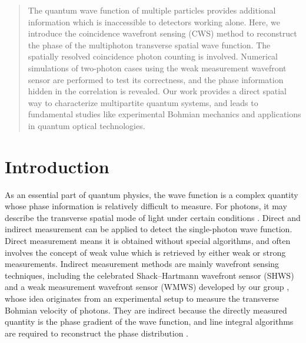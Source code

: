 \documentclass[pra,english,reprint,nofootinbib,aps,superscriptaddress,showpacs,showkeys]{revtex4-2}
\theoremstyle{definition}
\theoremstyle{remark}
\begin{document}
	\date{\today}
	
	\begin{abstract}
		The quantum wave function of multiple particles provides additional information which is inaccessible to detectors working alone. Here, we introduce the coincidence wavefront sensing (CWS) method to reconstruct the phase of the multiphoton transverse spatial wave function. The spatially resolved coincidence photon counting is involved. Numerical simulations of two-photon cases using the weak measurement wavefront sensor are performed to test its correctness, and the phase information hidden in the correlation is revealed. Our work provides a direct spatial way to characterize multipartite quantum systems, and leads to fundamental studies like experimental Bohmian mechanics and applications in quantum optical technologies.
	\end{abstract}
	
	\maketitle
	
	\section{Introduction}
	
	As an essential part of quantum physics, the wave function is a complex quantity whose phase information is relatively difficult to measure. For photons, it may describe the transverse spatial mode of light under certain conditions \cite{photonwf,Lundeen11}. Direct and indirect measurement can be applied to detect the single-photon wave function. Direct measurement means it is obtained without special algorithms, and often involves the concept of weak value \cite{AAV,wvrmp} which is retrieved by either weak \cite{Lundeen11,Shi2015} or strong \cite{Zhang2020} measurements. Indirect measurement methods are mainly wavefront sensing techniques, including the celebrated Shack--Hartmann wavefront sensor (SHWS) \cite{SHWS} and a weak measurement wavefront sensor (WMWS) developed by our group \cite{Yang2020,Zheng2021,Zheng2022}, whose idea originates from an experimental setup \cite{Kocsis2011} to measure the transverse Bohmian velocity \cite{Bohm1,Bohm2} of photons. They are indirect because the directly measured quantity is the phase gradient of the wave function, and line integral algorithms are required to reconstruct the phase distribution \cite{SHWSrecon}.
	
\end{document}
